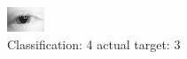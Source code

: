 \begin{figure}[h!]
\begin{center}
\includegraphics[width=0.60\columnwidth]{figures/ID78_class_4_target_3.png}
\end{center}
\caption{ Classification: 4 actual target: 3}
\label{fig:ID78_class_4_target_3}
\end{figure}
